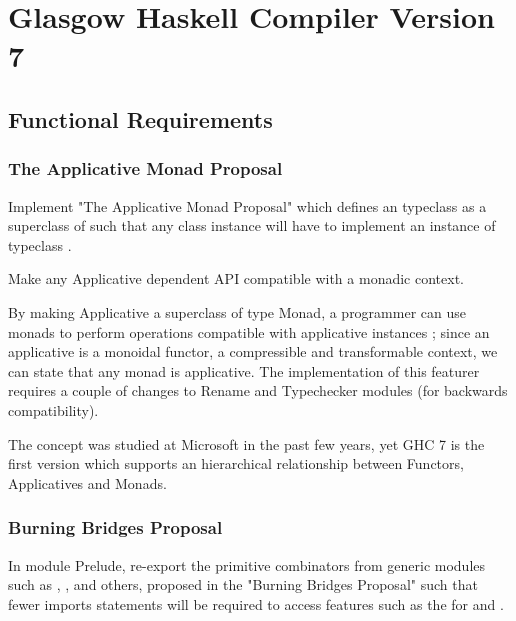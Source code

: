 \section{Glasgow Haskell Compiler Version 7}

\subsection{Functional Requirements}

\subsubsection{The Applicative Monad Proposal}

\begin{requirement}
Implement "The Applicative Monad Proposal" which defines an  typeclass as a superclass of  such that any  class instance will have to implement an instance of  typeclass \cite{wiki}.
\end{requirement}

\begin{wanted}
Make any Applicative dependent API compatible with a monadic context.
\end{wanted}

\begin{explication}
By making Applicative a superclass of type Monad, a programmer can use monads to perform operations compatible with applicative instances  \cite{wiki}; since an applicative is a monoidal functor, a compressible and transformable context, we can state that any monad is applicative. The implementation of this featurer requires a couple of changes to Rename and Typechecker modules (for backwards compatibility).
\end{explication}

\begin{new}
The concept was studied at Microsoft in the past few years, yet GHC 7 is the first version which supports an hierarchical relationship between Functors, Applicatives and Monads.
\end{new}


\subsubsection{Burning Bridges Proposal}

\begin{requirement}
In module Prelude, re-export the primitive combinators from generic modules such as , ,  and others, proposed in the "Burning Bridges Proposal" such that fewer imports statements will be required to access features such as the  for  and .
\end{requirement}

